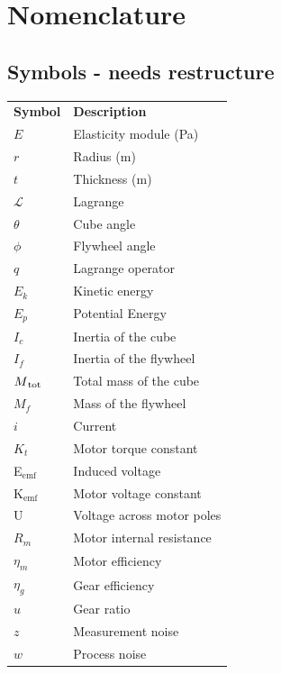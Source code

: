 \documentclass[a4paper,11pt]{kth-mag}
\newcommand{\textunderscript}[1]{$_{\text{#1}}$}
\begin{document}


\cleardoublepage
{}
\printindex
\tableofcontents*

\cleardoublepage
\chapter*{Nomenclature}
\section*{Symbols - needs restructure}
\noindent{}\begin{tabular}{@{}p{2.5cm}l}
\textbf{Symbol} 	& \textbf{Description} \vspace{.5em} \\
$E$ 		& Elasticity module (Pa) \\
$r$		& Radius (m) \\
$t$		& Thickness (m) \\
$\mathcal{L}$			& Lagrange \\
$\theta$		& Cube angle\\
$\phi$		& Flywheel angle \\
$q$			& Lagrange operator \\
$E_k	$		& Kinetic energy \\
$E_p$		& Potential Energy \\
$I_c$		& Inertia of the cube\\
$I_f$		& Inertia of the flywheel\\
$M\textsubscript{tot}$		& Total mass of the cube\\
$M_f$		& Mass of the flywheel \\
$i$			& Current\\
$K_t$		& Motor torque constant\\
E\textunderscript{emf} 	& Induced voltage \\
K\textunderscript{emf} 	& Motor voltage constant \\
U			& Voltage across motor poles\\
$R_m	$		& Motor internal resistance \\
$\eta_m$		& Motor efficiency\\	
$\eta_g$		& Gear efficiency \\
$u$			& Gear ratio\\
$z$			& Measurement noise \\
$w$			& Process noise \\

\end{tabular}
\clearpage
\end{document}
